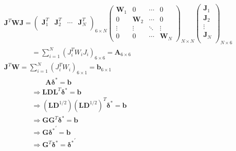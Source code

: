 \documentclass{article}
\begin{document}
\begin{CJK*}{GBK}{song}
\begin{equation}\left.
\begin{aligned}\\&
   \boldsymbol{J}^{T}\boldsymbol{W}\boldsymbol{J}
   =\left(
                     \begin{array}{cccc}
                       \boldsymbol{J}_1^{T} & \boldsymbol{J}_2^{T} & \cdots & \boldsymbol{J}_N^{T} \\
                     \end{array}
                   \right)_{6\times{N}}
                   \begin{pmatrix}
                    \boldsymbol{W}_{1}&0&\cdots&0
                    \\
                    0&\boldsymbol{W}_{2}&\cdots&0
                    \\
                    \vdots&\vdots&\ddots&\vdots
                    \\
                    0&0&\cdots&\boldsymbol{W}_{N}
                    \end{pmatrix}_{N\times{N}}
                    \left(
                      \begin{array}{c}
                        \boldsymbol{J}_1 \\
                        \boldsymbol{J}_2 \\
                        \vdots \\
                        \boldsymbol{J}_N \\
                      \end{array}
                    \right)_{N\times{6}}
                    \\&
                    \qquad\qquad=\sum\limits_{i=1}^N(J_i^TW_iJ_i)_{6\times{6}}= \boldsymbol{A}_{6\times{6}}
\\&
\boldsymbol{J}^{T}\boldsymbol{W}=\sum\limits_{i=1}^N(J_i^TW_i)_{6\times{1}}= \boldsymbol{b}_{6\times{1}}
\\&
\qquad\qquad\qquad\boldsymbol{A}\boldsymbol{\delta}^{*}=\boldsymbol{b}
\\&
\qquad\qquad\Rightarrow\boldsymbol{L}\boldsymbol{D}\boldsymbol{L}^{T}\boldsymbol{\delta}^{*}=\boldsymbol{b}
\\&
\qquad\qquad\Rightarrow(\boldsymbol{L}\boldsymbol{D}^{1/2})(\boldsymbol{L}\boldsymbol{D}^{1/2})^{T}\boldsymbol{\delta}^{*}=\boldsymbol{b}
\\&
\qquad\qquad\Rightarrow\boldsymbol{G}\boldsymbol{G}^{T}\boldsymbol{\delta}^{*}=\boldsymbol{b}
\\&
\qquad\qquad\Rightarrow\boldsymbol{G}{\boldsymbol{\delta}^{*}}^{'}=\boldsymbol{b}
\\&
\qquad\qquad\Rightarrow\boldsymbol{G}^{T}{\boldsymbol{\delta}^{*}}={\boldsymbol{\delta}^{*}}^{'}
    \\
\end{aligned}\right.\tag{4}\end{equation}




\end{CJK*}
\end{document}
